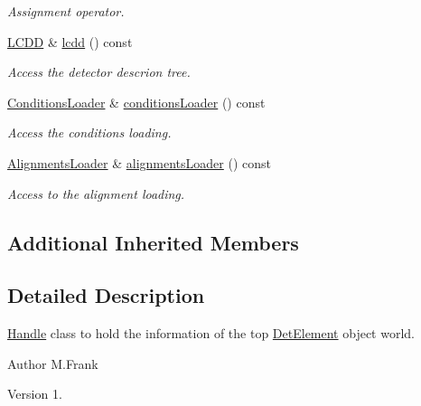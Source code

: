 \begin{DoxyCompactItemize}
\begin{DoxyCompactList}\small\item\em Assignment operator. \end{DoxyCompactList}\item 
\hyperlink{class_d_d4hep_1_1_geometry_1_1_l_c_d_d}{L\+C\+DD} \& \hyperlink{class_d_d4hep_1_1_geometry_1_1_world_af4d8c997d8ada86ade18d953106dc301}{lcdd} () const
\begin{DoxyCompactList}\small\item\em Access the detector descrion tree. \end{DoxyCompactList}\item 
\hyperlink{class_d_d4hep_1_1_geometry_1_1_world_aadddae79d9d6be44141befbbb4b7337b}{Conditions\+Loader} \& \hyperlink{class_d_d4hep_1_1_geometry_1_1_world_af15c1c1758a9f3603619d8a490a35c0a}{conditions\+Loader} () const
\begin{DoxyCompactList}\small\item\em Access the conditions loading. \end{DoxyCompactList}\item 
\hyperlink{class_d_d4hep_1_1_geometry_1_1_world_a4756d57ac9e7f6d43056b07dfbfe6904}{Alignments\+Loader} \& \hyperlink{class_d_d4hep_1_1_geometry_1_1_world_afb65fa4fa91e22fd96f4103d85158b3a}{alignments\+Loader} () const
\begin{DoxyCompactList}\small\item\em Access to the alignment loading. \end{DoxyCompactList}\end{DoxyCompactItemize}
\subsection*{Additional Inherited Members}


\subsection{Detailed Description}
\hyperlink{class_d_d4hep_1_1_handle}{Handle} class to hold the information of the top \hyperlink{class_d_d4hep_1_1_geometry_1_1_det_element}{Det\+Element} object \textquotesingle{}world\textquotesingle{}. 

\begin{DoxyAuthor}{Author}
M.\+Frank 
\end{DoxyAuthor}
\begin{DoxyVersion}{Version}
1. 
\end{DoxyVersion}


